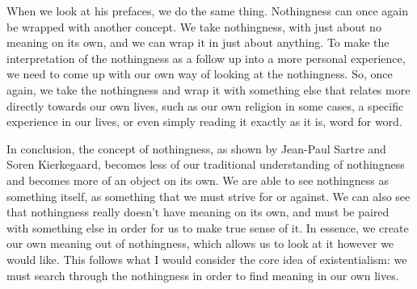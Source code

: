 \documentclass[12pt]{article}
\begin{document}
  When we look at his prefaces, we do the same thing. Nothingness can once again be wrapped with another concept.
  We take nothingness, with just about no meaning on its own, and we can wrap it in just about anything. To make the
  interpretation of the nothingness as a follow up into a more personal experience, we need to come up with our own
  way of looking at the nothingness. So, once again, we take the nothingness and wrap it with something else that
  relates more directly towards our own lives, such as our own religion in some cases, a specific experience in our
  lives, or even simply reading it exactly as it is, word for word.

  In conclusion, the concept of nothingness, as shown by Jean-Paul Sartre and Soren Kierkegaard, becomes less of our
  traditional understanding of nothingness and becomes more of an object on its own. We are able to see nothingness
  as something itself, as something that we must strive for or against. We can also see that nothingness really doesn't
  have meaning on its own, and must be paired with something else in order for us to make true sense of it. In essence,
  we create our own meaning out of nothingness, which allows us to look at it however we would like. This follows what
  I would consider the core idea of existentialism: we must search through the nothingness in order to find meaning in
  our own lives.
\end{document}
